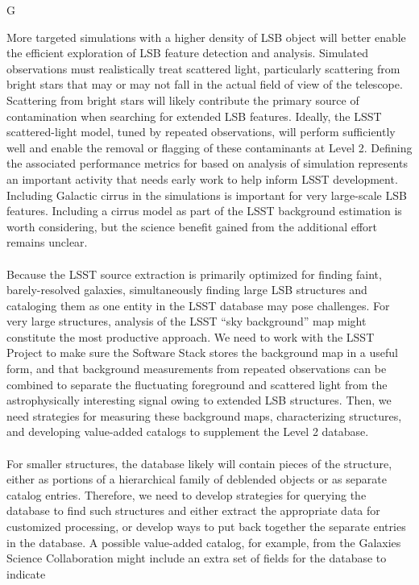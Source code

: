 {\begin{tasklist}{G}
\begin{task}
{More targeted simulations with a higher density of LSB object will better
enable the efficient exploration of LSB feature detection and analysis.
Simulated observations must realistically treat scattered light, particularly
scattering from bright stars that may or may not fall in the actual field of
view of the telescope. Scattering from bright stars will likely contribute the
primary source of contamination when searching for extended LSB features.
Ideally, the LSST scattered-light model,
tuned by repeated observations, will perform sufficiently well and enable the removal
or flagging of these contaminants at Level 2.  
Defining the associated performance metrics for
based on analysis of simulation represents an important activity that needs early work to 
help inform LSST development. Including Galactic cirrus in the simulations is important
for very large-scale LSB features. Including a cirrus model as part of the LSST background
estimation is worth considering, but the science benefit gained from the
additional effort remains unclear.\\
~\\
Because the LSST source extraction is primarily
optimized for finding faint, barely-resolved galaxies,
simultaneously finding large LSB structures and cataloging them as 
one entity in the LSST database may pose challenges. 
For very large structures, analysis of the LSST ``sky background''
map might constitute the most productive approach. 
We need to work with the LSST Project
to make sure the Software Stack stores the background map in a useful form, and that background
measurements from repeated observations can be combined to separate the fluctuating
foreground and scattered light from the astrophysically interesting signal owing to extended
LSB structures.
Then, we need strategies for measuring these background maps, characterizing
structures, and developing value-added catalogs to supplement the Level 2 database.\\
~\\
For smaller structures, the database likely will contain pieces 
of the structure, either as portions of a hierarchical
family of deblended objects or as separate catalog entries. Therefore, we need to 
develop strategies for querying the database to find such structures and either extract
the appropriate data for customized processing, or develop ways to put back together
the separate entries in the database. A possible value-added catalog, for example, from
the Galaxies Science Collaboration might include an extra set of fields for the database to indicate 
}
\end{task}
\end{tasklist}}
